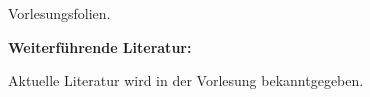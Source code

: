 \begin{course}
\begin{content}
\end{content}

\begin{media}Vorlesungsfolien.

\end{media}

\begin{literature}\textbf{Weiterführende Literatur:}

 

Aktuelle Literatur wird in der Vorlesung bekanntgegeben.

\end{literature}



\end{course}